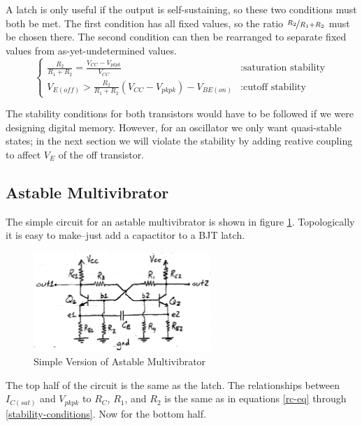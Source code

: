 \documentclass[titlepage, letterpaper, 10.5pt]{article}
\begin{document}
A latch is only useful if the output is self-sustaining, so these two conditions must both be met.
The first condition has all fixed values, so the ratio $\nicefrac{R_{2}}{R_{1}+R_{2}}$ must be chosen there.
The second condition can then be rearranged to separate fixed values from as-yet-undetermined values.
\begin{equation}
\left\{
	\begin{array}{lr}
	\frac{R_{2}}{R_{1}+R_{2}}=\frac{V_{CC}-V_{pkpk}}{V_{CC}}	& : \textrm{saturation stability}	\\
	V_{E(off)}>\frac{R_{2}}{R_{1}+R_{2}}(V_{CC}-V_{pkpk})-V_{BE(on)}	& : \textrm{cutoff stability}
	\end{array}
\right.
\label{stability-conditions}
\end{equation}

The stability conditions for both transistors would have to be followed if we were
designing digital memory. However, for an oscillator we only want quasi-stable states;
in the next section we will violate the stability by adding reative coupling to affect $V_{E}$ of the off transistor.

\clearpage
\subsection{Astable Multivibrator}
\label{astable-multivibrator}

The simple circuit for an astable multivibrator is shown in figure \ref{simple-circuit-diagram}.
Topologically it is easy to make--just add a capactitor to a BJT latch.

\begin{figure}[ht]
	\centering
	\includegraphics[width=0.6\textwidth]{diagrams/simple-circuit}
	\caption{Simple Version of Astable Multivibrator}
	\label{simple-circuit-diagram}
\end{figure}

The top half of the circuit is the same as the latch.
The relationships between $I_{C(sat)}$ and $V_{pkpk}$ to $R_{C}$, $R_{1}$, and $R_{2}$
is the same as in equations \ref{rc-eq} through \ref{stability-conditions}.
Now for the bottom half.
\end{document}
